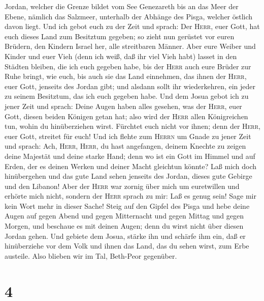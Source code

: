 Jordan, welcher die Grenze bildet vom See Genezareth bis an das Meer der
Ebene, nämlich das Salzmeer, unterhalb der Abhänge des Pisga, welcher
östlich davon liegt.  Und ich gebot euch zu der Zeit und
sprach: Der \textsc{Herr}, euer Gott, hat euch dieses Land zum Besitztum
gegeben; so zieht nun gerüstet vor euren Brüdern, den Kindern Israel
her, alle streitbaren Männer.  Aber eure Weiber und
Kinder und euer Vieh (denn ich weiß, daß ihr viel Vieh habt) lasset in
den Städten bleiben, die ich euch gegeben habe,  bis der
\textsc{Herr} auch eure Brüder zur Ruhe bringt, wie euch, bis auch sie
das Land einnehmen, das ihnen der \textsc{Herr}, euer Gott, jenseits des
Jordan gibt; und alsdann sollt ihr wiederkehren, ein jeder zu seinem
Besitztum, das ich euch gegeben habe.  Und dem Josua
gebot ich zu jener Zeit und sprach: Deine Augen haben alles gesehen, was
der \textsc{Herr}, euer Gott, diesen beiden Königen getan hat; also wird
der \textsc{Herr} allen Königreichen tun, wohin du hinüberziehen wirst.
 Fürchtet euch nicht vor ihnen; denn der \textsc{Herr},
euer Gott, streitet für euch!  Und ich flehte zum
\textsc{Herrn} um Gnade zu jener Zeit und sprach:  Ach,
\textsc{Herr}, \textsc{Herr}, du hast angefangen, deinem Knechte zu
zeigen deine Majestät und deine starke Hand; denn wo ist ein Gott im
Himmel und auf Erden, der es deinen Werken und deiner Macht gleichtun
könnte?  Laß mich doch hinübergehen und das gute Land
sehen jenseits des Jordan, dieses gute Gebirge und den Libanon!
 Aber der \textsc{Herr} war zornig über mich um
euretwillen und erhörte mich nicht, sondern der \textsc{Herr} sprach zu
mir: Laß es genug sein! Sage mir kein Wort mehr in dieser Sache!
 Steig auf den Gipfel des Pisga und hebe deine Augen auf
gegen Abend und gegen Mitternacht und gegen Mittag und gegen Morgen, und
beschaue es mit deinen Augen; denn du wirst nicht über diesen Jordan
gehen.  Und gebiete dem Josua, stärke ihn und schärfe ihm
ein, daß er hinüberziehe vor dem Volk und ihnen das Land, das du sehen
wirst, zum Erbe austeile.  Also blieben wir im Tal,
Beth-Peor gegenüber.

\hypertarget{section-3}{%
\section{4}\label{section-3}}

